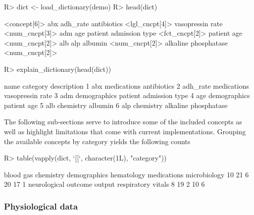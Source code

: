 \documentclass[
  notitle]{jss}
\begin{document}
\begin{CodeChunk}
\begin{CodeInput}
R> dict <- load_dictionary(demo)
R> head(dict)
\end{CodeInput}
\begin{CodeOutput}
<concept[6]>
                                  abx                              adh_rate 
           antibiotics <lgl_cncpt[4]>       vasopressin rate <num_cncpt[3]> 
                                  adm                                   age 
patient admission type <fct_cncpt[2]>            patient age <num_cncpt[2]> 
                                  alb                                   alp 
               albumin <num_cncpt[2]>   alkaline phosphatase <num_cncpt[2]> 
\end{CodeOutput}
\begin{CodeInput}
R> explain_dictionary(head(dict))
\end{CodeInput}
\begin{CodeOutput}
      name     category            description
1      abx  medications            antibiotics
2 adh_rate  medications       vasopressin rate
3      adm demographics patient admission type
4      age demographics            patient age
5      alb    chemistry                albumin
6      alp    chemistry   alkaline phosphatase
\end{CodeOutput}
\end{CodeChunk}

The following sub-sections serve to introduce some of the included
concepts as well as highlight limitations that come with current
implementations. Grouping the available concepts by category yields the
following counts

\begin{CodeChunk}
\begin{CodeInput}
R> table(vapply(dict, `[[`, character(1L), "category"))
\end{CodeInput}
\begin{CodeOutput}

   blood gas    chemistry demographics   hematology  medications microbiology 
          10           21            6           20           17            1 
neurological      outcome       output  respiratory       vitals 
           8           19            2           10            6 
\end{CodeOutput}
\end{CodeChunk}

\hypertarget{physiological-data}{%
\subsubsection{Physiological data}\label{physiological-data}}
\end{document}
